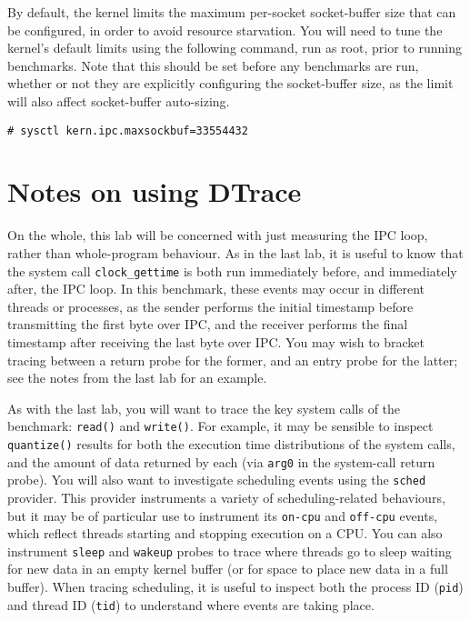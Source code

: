 \documentclass[a4paper,10pt]{article}
\begin{document}
By default, the kernel limits the maximum per-socket socket-buffer size that
can be configured, in order to avoid resource starvation.
You will need to tune the kernel's default limits using the following command,
run as root, prior to running benchmarks.
Note that this should be set before any benchmarks are run, whether or not
they are explicitly configuring the socket-buffer size, as the limit will also
affect socket-buffer auto-sizing.

\begin{verbatim}
# sysctl kern.ipc.maxsockbuf=33554432
\end{verbatim}

\section*{Notes on using DTrace}

On the whole, this lab will be concerned with just measuring the IPC loop,
rather than whole-program behaviour.
As in the last lab, it is useful to know that the system call
\texttt{clock\_gettime} is both run immediately before, and immediately after,
the IPC loop.
In this benchmark, these events may occur in different threads or processes,
as the sender performs the initial timestamp before transmitting the first
byte over IPC, and the receiver performs the final timestamp after receiving
the last byte over IPC.
You may wish to bracket tracing between a return probe for the former, and an
entry probe for the latter; see the notes from the last lab for an example.

As with the last lab, you will want to trace the key system calls of the
benchmark: \texttt{read()} and \texttt{write()}.
For example, it may be sensible to inspect \texttt{quantize()} results for
both the execution time distributions of the system calls, and the amount of
data returned by each (via \texttt{arg0} in the system-call return probe).
You will also want to investigate scheduling events using the \texttt{sched}
provider.
This provider instruments a variety of scheduling-related behaviours, but it
may be of particular use to instrument its \texttt{on-cpu} and
\texttt{off-cpu} events, which reflect threads starting and stopping
execution on a CPU.
You can also instrument \texttt{sleep} and \texttt{wakeup} probes to trace
where threads go to sleep waiting for new data in an empty kernel buffer (or
for space to place new data in a full buffer).
When tracing scheduling, it is useful to inspect both the process ID
(\texttt{pid}) and thread ID (\texttt{tid}) to understand where events are
taking place.
\end{document}
